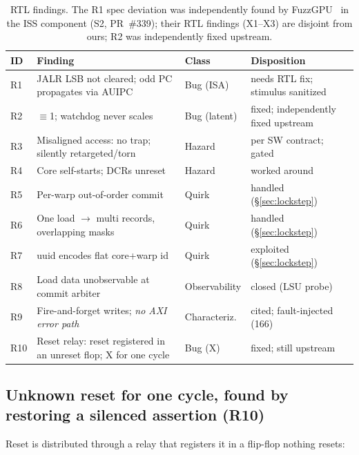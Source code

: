 \documentclass[conference]{IEEEtran}
\newcommand{\code}[1]{\texttt{\detokenize{#1}}}
\begin{document}
\begin{table}[t]
	\caption{RTL findings. The R1 spec deviation was independently found
		by FuzzGPU~\cite{fuzzgpu} in the ISS component (S2, PR~\#339);
		their RTL findings (X1--X3) are disjoint from ours; R2 was
		independently fixed
		upstream.}
	\label{tab:rtlobs}
	\centering
	\scriptsize
	\begin{tabular}{p{0.4cm}p{3.3cm}p{1.7cm}p{1.4cm}}
		\toprule
		ID  & Finding                                                           & Class         & Disposition                         \\
		\midrule
		R1  & JALR LSB not cleared; odd PC propagates via AUIPC                 & Bug (ISA)     & needs RTL fix; stimulus sanitized   \\
		R2  & \code{STALL_TIMEOUT} \code{1**N}$\equiv$1; watchdog never scales  & Bug (latent)  & fixed; independently fixed upstream \\
		R3  & Misaligned access: no trap; silently retargeted/torn              & Hazard        & per SW contract; gated              \\
		R4  & Core self-starts; DCRs unreset                                    & Hazard        & worked around                       \\
		R5  & Per-warp out-of-order commit                                      & Quirk         & handled (\S\ref{sec:lockstep})      \\
		R6  & One load $\to$ multi records, overlapping masks                   & Quirk         & handled (\S\ref{sec:lockstep})      \\
		R7  & uuid encodes flat core+warp id                                    & Quirk         & exploited (\S\ref{sec:lockstep})    \\
		R8  & Load data unobservable at commit arbiter                          & Observability & closed (LSU probe)                  \\
		R9  & Fire-and-forget writes; \emph{no AXI error path}                  & Characteriz.  & cited; fault-injected (166)         \\
		R10 & Reset relay: reset registered in an unreset flop; X for one cycle & Bug (X)       & fixed; still upstream               \\
		\bottomrule
	\end{tabular}
\end{table}

\subsection{Unknown reset for one cycle, found by restoring a silenced
	assertion (R10)}
\label{sec:r10}
Reset is distributed through a relay that registers it in a flip-flop
nothing resets:
\end{document}
